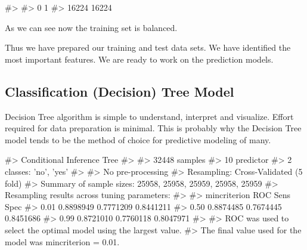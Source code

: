 \begin{Schunk}
\begin{Soutput}
#> 
#>     0     1 
#> 16224 16224
\end{Soutput}
\end{Schunk}

As we can see now the training set is balanced.

Thus we have prepared our training and test data sets. We have
identified the most important features. We are ready to work on the
prediction models.

\hypertarget{classification-decision-tree-model}{%
\subsection{Classification (Decision) Tree
Model}\label{classification-decision-tree-model}}

Decision Tree algorithm is simple to understand, interpret and
visualize. Effort required for data preparation is minimal. This is
probably why the Decision Tree model tends to be the method of choice
for predictive modeling of many.

\begin{Schunk}
\begin{Soutput}
#> Conditional Inference Tree 
#> 
#> 32448 samples
#>    10 predictor
#>     2 classes: 'no', 'yes' 
#> 
#> No pre-processing
#> Resampling: Cross-Validated (5 fold) 
#> Summary of sample sizes: 25958, 25958, 25959, 25958, 25959 
#> Resampling results across tuning parameters:
#> 
#>   mincriterion  ROC        Sens       Spec     
#>   0.01          0.8898949  0.7771209  0.8441211
#>   0.50          0.8874485  0.7674445  0.8451686
#>   0.99          0.8721010  0.7760118  0.8047971
#> 
#> ROC was used to select the optimal model using the largest value.
#> The final value used for the model was mincriterion = 0.01.
\end{Soutput}
\end{Schunk}

